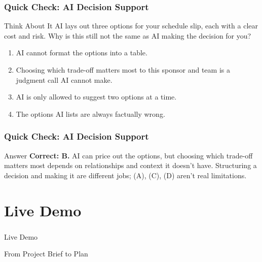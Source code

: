 \begin{frame}[fragile]\frametitle{Quick Check: AI Decision Support}
\begin{block}{Think About It}
AI lays out three options for your schedule slip, each with a clear cost and risk. Why is this still not the same as AI making the decision for you?
\begin{enumerate}
  \item[A.] AI cannot format the options into a table.
  \item[B.] Choosing which trade-off matters most to this sponsor and team is a judgment call AI cannot make.
  \item[C.] AI is only allowed to suggest two options at a time.
  \item[D.] The options AI lists are always factually wrong.
\end{enumerate}
\end{block}
\end{frame}

\begin{frame}[fragile]\frametitle{Quick Check: AI Decision Support}
\begin{block}{Answer}
\textbf{Correct: B.} AI can price out the options, but choosing which trade-off matters most depends on relationships and context it doesn't have. Structuring a decision and making it are different jobs; (A), (C), (D) aren't real limitations.
\end{block}
\end{frame}

\section[Demo]{Live Demo}
\begin{frame}[fragile]\frametitle{}
\begin{center}
{\Large Live Demo}

{\small From Project Brief to Plan}
\end{center}
\end{frame}

